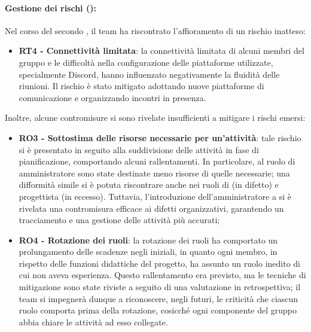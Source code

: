 \paragraph*{Gestione dei rischi ():}
\par Nel corso del secondo , il team ha riscontrato l'affioramento di un rischio inatteso:
\begin{itemize}
  \item \textbf{RT4 - Connettività limitata}: la connettività limitata di alcuni membri del gruppo e le difficoltà nella configurazione delle piattaforme utilizzate, specialmente Discord, hanno influenzato negativamente la fluidità delle riunioni. Il rischio è stato mitigato adottando nuove piattaforme di comunicazione e organizzando incontri in presenza.
\end{itemize}

\par Inoltre, alcune contromisure si sono rivelate insufficienti a mitigare i rischi emersi:
\begin{itemize}
  \item \textbf{RO3 - Sottostima delle risorse necessarie per un'attività}: tale rischio si è presentato in seguito alla suddivisione delle attività in fase di pianificazione, comportando alcuni rallentamenti. In particolare, al ruolo di amministratore sono state destinate meno risorse di quelle necessarie; una difformità simile si è potuta riscontrare anche nei ruoli di \Programmatore{} (in difetto) e progettista (in eccesso). Tuttavia, l'introduzione dell'amministratore a  si è rivelata una contromisura efficace ai difetti organizzativi, garantendo un tracciamento e una gestione delle attività più accurati;
  \item \textbf{RO4 - Rotazione dei ruoli}: la rotazione dei ruoli ha comportato un prolungamento delle scadenze negli  iniziali, in quanto ogni membro, in rispetto delle funzioni didattiche del progetto, ha assunto un ruolo inedito di cui non aveva esperienza. Questo rallentamento era previsto, ma le tecniche di mitigazione sono state riviste a seguito di una valutazione in retrospettiva; il team si impegnerà dunque a riconoscere, negli  futuri, le criticità che ciascun ruolo comporta prima della rotazione, cosicché ogni componente del gruppo abbia chiare le attività ad esso collegate.
\end{itemize}

